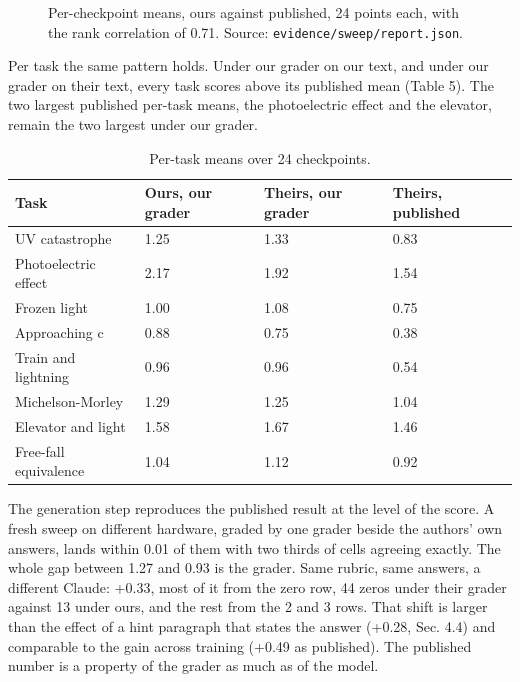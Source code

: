 \documentclass[reprint,prx,amsmath,amssymb,aps,superscriptaddress]{revtex4-2}
\begin{document}
\begin{figure}[t]
\centering
{}
\caption{Per-checkpoint means, ours against published, 24 points each, with the rank correlation of 0.71. Source: \texttt{evidence/sweep/report.json}.}
\label{fig:3}
\end{figure}

Per task the same pattern holds. Under our grader on our text, and under our grader on their text, every task scores above its published mean (Table 5). The two largest published per-task means, the photoelectric effect and the elevator, remain the two largest under our grader.

\begin{table}[t]
\caption{Per-task means over 24 checkpoints.}
\begin{ruledtabular}
\begin{tabular}{llll}
Task & Ours, our grader & Theirs, our grader & Theirs, published \\
\hline
UV catastrophe & 1.25 & 1.33 & 0.83 \\
Photoelectric effect & 2.17 & 1.92 & 1.54 \\
Frozen light & 1.00 & 1.08 & 0.75 \\
Approaching c & 0.88 & 0.75 & 0.38 \\
Train and lightning & 0.96 & 0.96 & 0.54 \\
Michelson-Morley & 1.29 & 1.25 & 1.04 \\
Elevator and light & 1.58 & 1.67 & 1.46 \\
Free-fall equivalence & 1.04 & 1.12 & 0.92 \\
\end{tabular}
\end{ruledtabular}
\end{table}



The generation step reproduces the published result at the level of the score. A fresh sweep on different hardware, graded by one grader beside the authors' own answers, lands within 0.01 of them with two thirds of cells agreeing exactly. The whole gap between 1.27 and 0.93 is the grader. Same rubric, same answers, a different Claude: +0.33, most of it from the zero row, 44 zeros under their grader against 13 under ours, and the rest from the 2 and 3 rows. That shift is larger than the effect of a hint paragraph that states the answer (+0.28, Sec. 4.4) and comparable to the gain across training (+0.49 as published). The published number is a property of the grader as much as of the model.
\end{document}
